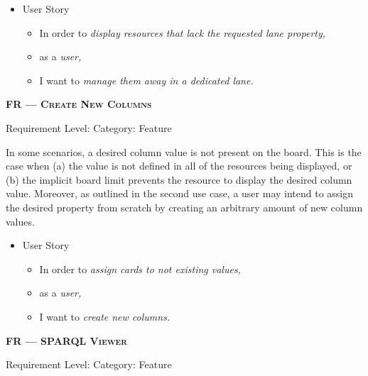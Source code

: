 \begin{itemize}[after=\vspace{1em}]
    \setlength\itemsep{-0.5em}
	\item[] User Story\\[-7.8mm]
	\begin{itemize}
    \setlength\itemsep{-0.5em}
        \item[] In order to \textit{display resources that lack the requested lane property,}
        \item[] as a \textit{user,}
        \item[] I want to \textit{manage them away in a dedicated lane.}
    \end{itemize}
\end{itemize}




\centerline{\textbf{FR\textsubscript{} --- \textsc{Create New Columns}}}
\centerline{\small Requirement Level:  \quad{} Category: Feature}

\noindent In some scenarios, a desired column value is not present on the board. This is the case when (a) the value is not defined in all of the resources being displayed, or (b) the implicit board limit prevents the resource to display the desired column value. Moreover, as outlined in the second use case, a user may intend to assign the desired property from scratch by creating an arbitrary amount of new column values.


\begin{itemize}[after=\vspace{1em}]
    \setlength\itemsep{-0.5em}
	\item[] User Story\\[-7.8mm]
	\begin{itemize}
    \setlength\itemsep{-0.5em}
        \item[] In order to \textit{assign cards to not existing values,}
        \item[] as a \textit{user,}
        \item[] I want to \textit{create new columns.}
    \end{itemize}
\end{itemize}





\centerline{\textbf{FR\textsubscript{} --- \textsc{\acrshort*{SPARQL} Viewer}}}
\centerline{\small Requirement Level:  \quad{} Category: Feature}

